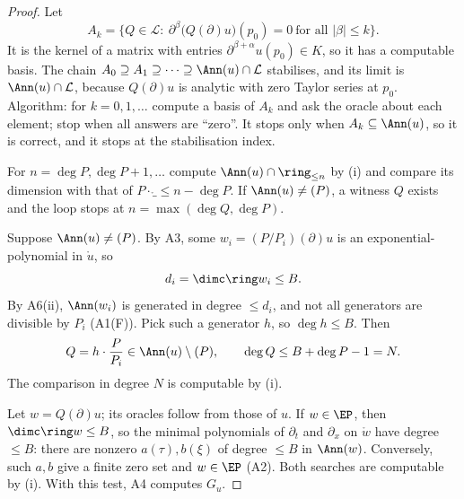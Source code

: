 \begin{proof}
Let
\[
A_k=\{Q\in\mathcal L:\ \partial^\beta\big(Q(\partial)u\big)(p_0)=0\ \text{for all }|\beta|\le k\}.
\]
It is the kernel of a matrix with entries $\partial^{\beta+\alpha}u(p_0)\in K$, so it has a computable basis. The chain $A_0\supseteq A_1\supseteq\dots\supseteq\Ann(u)\cap\mathcal L$ stabilises, and its limit is $\Ann(u)\cap\mathcal L$, because $Q(\partial)u$ is analytic with zero Taylor series at $p_0$. Algorithm: for $k=0,1,\dots$ compute a basis of $A_k$ and ask the oracle about each element; stop when all answers are ``zero''. It stops only when $A_k\subseteq\Ann(u)$, so it is correct, and it stops at the stabilisation index.

For $n=\deg P,\deg P+1,\dots$ compute $\Ann(u)\cap\ring_{\le n}$ by (i) and compare its dimension with that of $P\cdot\ring_{\le n-\deg P}$. If $\Ann(u)\ne(P)$, a witness $Q$ exists and the loop stops at $n=\max(\deg Q,\deg P)$.

Suppose $\Ann(u)\ne(P)$. By A3, some $w_i=(P/P_i)(\partial)u$ is an exponential-polynomial in $\ring u$, so
\[
d_i=\dimc\ring w_i\le B .
\]
By A6(ii), $\Ann(w_i)$ is generated in degree $\le d_i$, and not all generators are divisible by $P_i$ (A1(F)). Pick such a generator $h$, so $\deg h\le B$. Then
\[
Q=h\cdot\frac{P}{P_i}\in\Ann(u)\setminus(P),\qquad \deg Q\le B+\deg P-1=N .
\]
The comparison in degree $N$ is computable by (i).

Let $w=Q(\partial)u$; its oracles follow from those of $u$. If $w\in\EP$, then $\dimc\ring w\le B$, so the minimal polynomials of $\partial_t$ and $\partial_x$ on $\ring w$ have degree $\le B$: there are nonzero $a(\tau),b(\xi)$ of degree $\le B$ in $\Ann(w)$. Conversely, such $a,b$ give a finite zero set and $w\in\EP$ (A2). Both searches are computable by (i). With this test, A4 computes $G_u$.

\end{proof}

